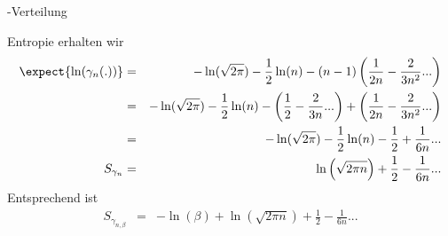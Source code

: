 \begin{chapter}{\titlestr}
\begin{appendix}
\begin{section}{\titlemath{$\Gamma$}-Verteilung}
\begin{subsection}{Entropie}
erhalten wir
\begin{eqnarray}
\label{gamma_entropy}
\expect{\ln(\gamma_n(.))} &=& -\ln(\sqrt{2\pi})-\frac{1}{2}\ln(n)-(n-1)\left(\frac{1}{2n}-\frac{2}{3n^2}...\right)\cr
&=& -\ln(\sqrt{2\pi})-\frac{1}{2}\ln(n)-\left(\frac{1}{2}-\frac{2}{3n}...\right)+\left(\frac{1}{2n}-\frac{2}{3n^2}...\right)\cr
&=& -\ln(\sqrt{2\pi})-\frac{1}{2}\ln(n)-\frac{1}{2}+\frac{1}{6n}...\cr
S_{\gamma_n}&=& \ln\left(\sqrt{2\pi n}\right)+\frac{1}{2}-\frac{1}{6n}...
\end{eqnarray}
Entsprechend ist
\begin{eqnarray}
\label{gamma_entropy_beta}
S_{\gamma_{n,\beta}}&=& -\ln(\beta)+\ln\left(\sqrt{2\pi n}\right)+\frac{1}{2}-\frac{1}{6n}...
\end{eqnarray}
\end{subsection}
\end{section}


\ifx\makebook\undefined
	\end{appendix}
	
	
\else
	\end{chapter}
\fi
